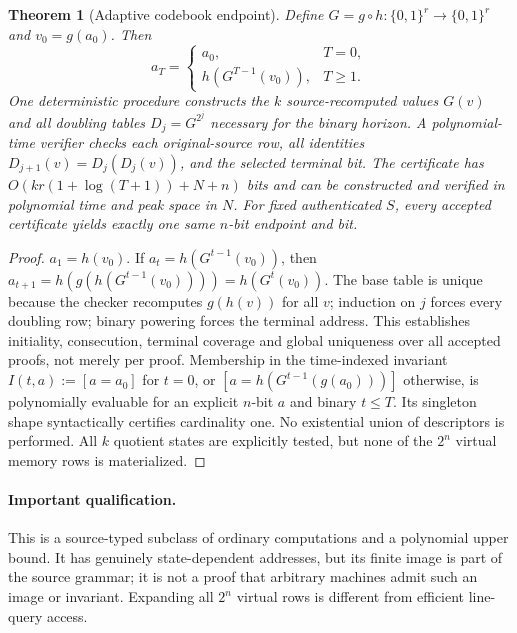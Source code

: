 \documentclass[11pt]{article}
\newtheorem{theorem}{Theorem}
\begin{document}
\begin{theorem}[Adaptive codebook endpoint]
Define $G=g\circ h:\{0,1\}^r\to\{0,1\}^r$ and $v_0=g(a_0)$. Then
\[
a_T=\begin{cases}a_0,&T=0,\\ h(G^{T-1}(v_0)),&T\ge1.\end{cases}
\]
One deterministic procedure constructs the $k$ source-recomputed values $G(v)$ and all doubling tables $D_j=G^{2^j}$ necessary for the binary horizon. A polynomial-time verifier checks each original-source row, all identities $D_{j+1}(v)=D_j(D_j(v))$, and the selected terminal bit. The certificate has $O(k r(1+\log(T+1))+N+n)$ bits and can be constructed and verified in polynomial time and peak space in $N$. For fixed authenticated $S$, \emph{every} accepted certificate yields exactly one same $n$-bit endpoint and bit.
\end{theorem}
\begin{proof}
$a_1=h(v_0)$. If $a_t=h(G^{t-1}(v_0))$, then $a_{t+1}=h(g(h(G^{t-1}(v_0))))=h(G^t(v_0))$. The base table is unique because the checker recomputes $g(h(v))$ for all $v$; induction on $j$ forces every doubling row; binary powering forces the terminal address. This establishes initiality, consecution, terminal coverage and global uniqueness over all accepted proofs, not merely per proof. Membership in the time-indexed invariant $I(t,a):=[a=a_0]$ for $t=0$, or $[a=h(G^{t-1}(g(a_0)))]$ otherwise, is polynomially evaluable for an explicit $n$-bit $a$ and binary $t\le T$. Its singleton shape syntactically certifies cardinality one. No existential union of descriptors is performed. All $k$ quotient states are explicitly tested, but none of the $2^n$ virtual memory rows is materialized.
\end{proof}
\paragraph{Important qualification.} This is a source-typed subclass of ordinary computations and a polynomial upper bound. It has genuinely state-dependent addresses, but its finite image is part of the source grammar; it is not a proof that arbitrary machines admit such an image or invariant. Expanding all $2^n$ virtual rows is different from efficient line-query access.
\end{document}
